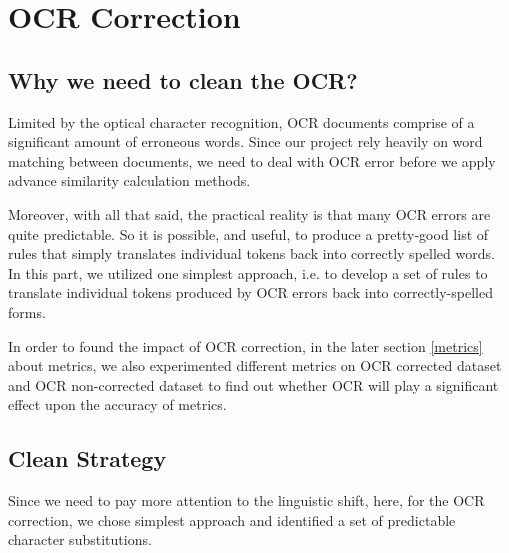 \section{OCR Correction}
\subsection{Why we need to clean the OCR?}

Limited by the optical character recognition, OCR documents comprise of a significant amount of erroneous words. Since our project rely heavily on word matching between documents, we need to deal with OCR error before we apply advance similarity calculation methods. 

Moreover, with all that said, the practical reality is that many OCR errors are quite predictable. So it is possible, and useful, to produce a pretty-good list of rules that simply translates individual tokens back into correctly spelled words. In this part, we utilized one simplest approach, i.e. to develop a set of rules to translate individual tokens produced by OCR errors back into correctly-spelled forms.

In order to found the impact of OCR correction, in the later section \ref{metrics} about metrics, we also experimented different metrics on OCR corrected dataset and OCR non-corrected dataset to find out whether OCR will play a significant effect upon the accuracy of metrics.

\subsection{Clean Strategy}
Since we need to pay more attention to the linguistic shift, here, for the OCR correction, we chose simplest approach and identified a set of predictable character substitutions. 

